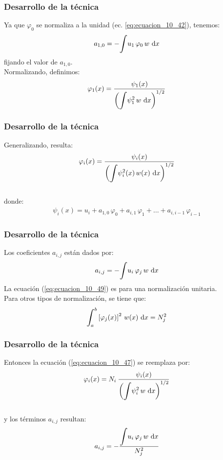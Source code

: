 \documentclass[12pt]{beamer}
\begin{document}
\begin{frame}
\frametitle{Desarrollo de la técnica}
Ya que $\varphi_{0}$ se normaliza a la unidad (ec. \ref{eq:ecuacion_10_42}), tenemos:
\pause
\begin{align}
a_{1,0} = - \scaleint{6ex} u_{1} \, \varphi_{0} \, w \, \dd{x}
\label{eq:ecuacion_10_45}
\end{align}
fijando el valor de $a_{1, 0}$.
\\
\bigskip
\pause
Normalizando, definimos:
\pause
\begin{align}
\varphi_{1} (x) = \dfrac{\psi_{1}(x)}{\left( \displaystyle \scaleint{6ex} \psi_{1}^{2} \, w \, \dd{x} \right)^{1/2}}
\label{eq:ecuacion_10_46}
\end{align}
\end{frame}
\begin{frame}
\frametitle{Desarrollo de la técnica}
Generalizando, resulta:
\pause
\begin{align}
\varphi_{i}(x) = \dfrac{\psi_{i}(x)}{\left( \displaystyle \scaleint{6ex} \psi_{i}^{2}(x) \, w(x) \, \dd{x} \right)^{1/2}}
\label{eq:ecuacion_10_47}
\end{align}
\\
\bigskip
\pause
donde:
\pause
\begin{align}
\psi_{i}(x) = u_{i} + a_{1, 0} \, \varphi_{0} + a_{i, 1} \, \varphi_{1} + \ldots + a_{i, i-1} \, \varphi_{i-1}
\label{eq:ecuacion_10_48}
\end{align}
\end{frame}
\begin{frame}
\frametitle{Desarrollo de la técnica}
Los coeficientes $a_{i, j}$ están dados por:
\pause
\begin{align}
a_{i, j} = - \scaleint{6ex} u_{i} \, \varphi_{j} \, w \, \dd{x}
\label{eq:ecuacion_10_49}
\end{align}
La ecuación (\ref{eq:ecuacion_10_49}) es para una normalización unitaria.
\\
\bigskip
\pause
Para otros tipos de normalización, se tiene que:
\pause
\begin{align*}
\scaleint{6ex}_{\bs a}^{b} \left[ \varphi_{j} (x) \right]^{2} \, w(x) \, \dd{x} =  N_{j}^{2}
\end{align*}
\end{frame}
\begin{frame}
\frametitle{Desarrollo de la técnica}
Entonces la ecuación (\ref{eq:ecuacion_10_47}) se reemplaza por:
\pause
\begin{align}
\varphi_{i}(x) =  N_{i} \: \dfrac{\psi_{i}(x)}{\left( \displaystyle \scaleint{6ex} \psi_{i}^{2} \, w \, \dd{x} \right)^{1/2}}
\label{eq:ecuacion_10_47a}
\end{align}
\\
\bigskip
\pause
y los términos $a_{i,j}$ resultan:
\pause
\begin{align}
a_{i, j} = - \dfrac{ \displaystyle \scaleint{6ex} u_{i} \, \varphi_{j} \, w \, \dd{x}}{N_{j}^{2}}
\label{eq:ecuacion_10_49a}
\end{align}
\end{frame}
\end{document}
